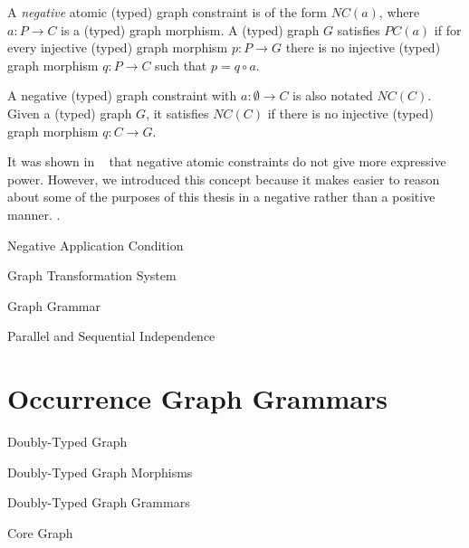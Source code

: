 \begin{remark}
\end{remark}

\begin{definition}
A \emph{negative} atomic (typed) graph constraint is of the form $NC(a)$, where $a : P \rightarrow C$ is a (typed) graph morphism. A (typed) graph $G$ satisfies $PC(a)$ if for every injective (typed) graph morphism $p : P \rightarrow G$ there is no injective (typed) graph morphism $q : P \rightarrow C$ such that $p = q \circ a$.

  A negative (typed) graph constraint with $a : \emptyset \rightarrow C$ is also notated $NC(C)$. Given a (typed) graph $G$, it satisfies $NC(C)$ if there is no injective (typed) graph morphism $q : C \rightarrow G$.


\end{definition}

\begin{remark} It was shown in ~\cite{Ehrig2006} that negative atomic constraints do not give more expressive power. However, we introduced this concept because it makes easier to reason about some of the purposes of this thesis in a negative rather than a positive manner. .
\end{remark}

\begin{definition}{Negative Application Condition}


\end{definition}

\begin{definition}{Graph Transformation System}
\end{definition}

\begin{definition}{Graph Grammar}
\end{definition}

\begin{definition}{Parallel and Sequential Independence}
\end{definition}


\section{Occurrence Graph Grammars}

\begin{definition}{Doubly-Typed Graph}
\end{definition}

\begin{definition}{Doubly-Typed Graph Morphisms}
\end{definition}

\begin{definition}{Doubly-Typed Graph Grammars}
\end{definition}

\begin{definition}{Core Graph}
\end{definition}
